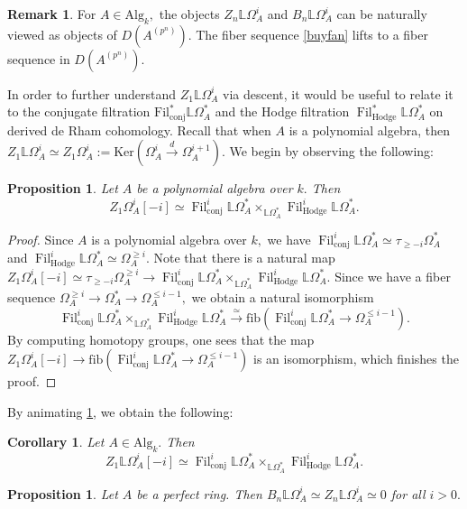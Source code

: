 \documentclass[10pt,letterpaper]{amsart}
\numberwithin{figure}{section}
\numberwithin{equation}{section}
\newtheorem{corollary}[figure]{Corollary}
\newtheorem{proposition}[figure]{Proposition}
\theoremstyle{definition}
\theoremstyle{definition}
\newtheorem{remark}[figure]{Remark}
\theoremstyle{definition}
\theoremstyle{definition}
\DeclareMathOperator{\conj}{conj}
\DeclareMathOperator{\Hodge}{Hodge}
\DeclareMathOperator{\Fil}{Fil}
\newcommand{\LL}{\L}
\renewcommand{\L}{\mathbb{L}}
\begin{document}
\begin{remark}
For $A \in \mathrm{Alg}_k,$ the objects $Z_n \LL \Omega^i_A$ and $B_n \LL \Omega^i_A$ can be naturally viewed as objects of $D(A^{(p^n)}).$ The fiber sequence \cref{buyfan} lifts to a fiber sequence in $D(A^{(p^n)}).$
\end{remark}{}



In order to further understand $Z_1\LL \Omega^i_A$ via descent, it would be useful to relate it to the conjugate filtration $\mathrm{Fil}^*_{\mathrm{conj}} \LL \Omega^*_A$ and the Hodge filtration $\Fil^*_{\Hodge} \LL \Omega^*_A$ on derived de Rham cohomology. Recall that when $A$ is a polynomial algebra, then $Z_1\LL \Omega^i_A \simeq Z_1  \Omega^i_A := \mathrm{Ker}(\Omega^i_A \xrightarrow{d} \Omega^{i+1}_A).$ We begin by observing the following:

\begin{proposition}\label{intersection}
Let $A$ be a polynomial algebra over $k.$ Then $$Z_1\Omega^i_A[-i] \simeq \Fil^i_{\conj} \LL \Omega^*_A \times_{\LL \Omega^*_A} \Fil^i_{\Hodge} \LL \Omega^*_A.$$
\end{proposition}{}


\begin{proof}
    Since $A$ is a polynomial algebra over $k,$ we have $\Fil ^i_{\conj} \LL \Omega^*_A \simeq \tau_{\ge -i} \Omega^*_A$ and $\Fil^i_{\Hodge} \LL \Omega_A^* \simeq \Omega_A^{\ge i}.$ Note that there is a natural map $Z_1\Omega_A^i[-i] \simeq \tau_{\ge -i} \Omega_A^{\ge i} \to \Fil^i_{\conj} \LL \Omega^*_A \times_{\LL \Omega^*_A} \Fil^i_{\Hodge} \LL \Omega^*_A. $ Since we have a fiber sequence $\Omega_A^{\ge i} \to \Omega_A^* \to \Omega_A^{\le i-1},$ we obtain a natural isomorphism $$\Fil^i_{\conj} \LL \Omega^*_A \times_{\LL \Omega^*_A} \Fil^i_{\Hodge} \LL \Omega^*_A \xrightarrow{\simeq} \mathrm{fib} (\Fil^i_{\conj} \LL \Omega_A^* \to \Omega_A^{\le i-1}).$$ By computing homotopy groups, one sees that the map $Z_1\Omega_A^i[-i] \to \mathrm{fib} (\Fil^i_{\conj} \LL \Omega_A^* \to \Omega_A^{\le i-1})$ is an isomorphism, which finishes the proof.
\end{proof}{}
By animating \cref{intersection}, we obtain the following:
\begin{corollary}\label{sunday}
    Let $A \in \mathrm{Alg}_k.$ Then $$Z_1\LL\Omega^i_A[-i] \simeq \Fil^i_{\conj} \LL \Omega^*_A \times_{\LL \Omega^*_A} \Fil^i_{\Hodge} \LL \Omega^*_A.$$
\end{corollary}{}

\begin{proposition}\label{perfectringcart}
    Let $A$ be a perfect ring. Then $B_n \LL \Omega^i_A \simeq Z_n \LL \Omega^i_A \simeq 0$ for all $i >0.$
\end{proposition}{}
\end{document}
